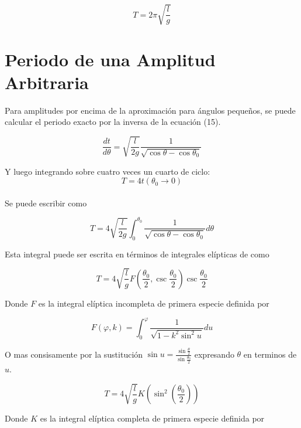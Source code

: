 \documentclass[12pt]{article}
\begin{document}
\begin{equation}
T= 2\pi \sqrt{\frac{l}{g}}
\end{equation}

\section{Periodo de una Amplitud Arbitraria}

Para amplitudes por encima de la aproximación para ángulos pequeños, se puede calcular el periodo exacto por la inversa de la ecuación (15).

\begin{equation}
\frac{dt}{d\theta}= \sqrt{\frac{l}{2g}} \frac{1}{\sqrt{\cos\theta - \cos \theta_0}}
\end{equation}
 
Y luego integrando sobre cuatro veces un cuarto de ciclo:\\
 
$$T=4t(\theta_0 \rightarrow 0)$$\\

Se puede escribir como

\begin{equation}
T= 4\sqrt{\frac{l}{2g}} \int_0^{\theta_0} \frac{1}{\sqrt{\cos\theta - \cos \theta_0}} d\theta
\end{equation}

Esta integral puede ser escrita en términos de integrales elípticas de como

\begin{equation}
T=4\sqrt{\frac{l}{g}} F \left(\frac{\theta_0}{2},\csc\frac{\theta_0}{2}\right)\csc\frac{\theta_0}{2}
\end{equation}

Donde $F$ es la integral elíptica incompleta de primera especie definida por

\begin{equation}
F(\varphi , k)= \int_0^{\varphi} \frac{1}{\sqrt{1-k^2 \sin^2 u}}du
\end{equation}

O mas consisamente por la sustitución $\sin u= \frac{\sin\frac{\theta}{2}}{\sin\frac{\theta_0}{2}}$ expresando $\theta$ en terminos de $u$.

\begin{equation}
T=4\sqrt{\frac{l}{g}} K \left(\sin^2\left(\frac{\theta_0}{2}\right)\right)
\end{equation}

Donde $K$ es la integral elíptica completa de primera especie definida por
\end{document}
